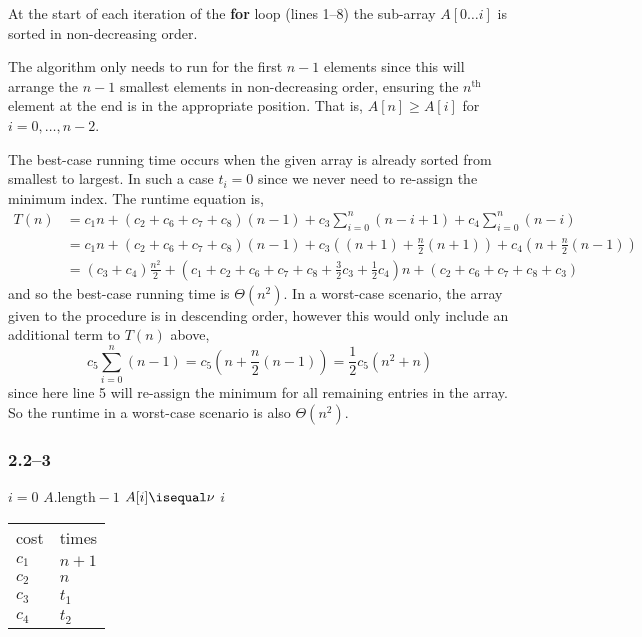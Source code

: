 \begin{invariant}
	At the start of each iteration of the \textbf{for} loop (lines 1--8) the sub-array $A[0\ldots i]$ is sorted in non-decreasing order.
\end{invariant}

The algorithm only needs to run for the first $n-1$ elements since this will arrange the $n-1$ smallest elements in non-decreasing order, ensuring the $n^{\text{th}}$ element at the end is in the appropriate position. That is, $A[n]\geq A[i]$ for $i=0,\ldots,n-2$.

The best-case running time occurs when the given array is already sorted from smallest to largest. In such a case $t_{i}=0$ since we never need to re-assign the minimum index. The runtime equation is, 
\begin{equation*}
	\begin{aligned}
		T(n) &= c_{1}n + (c_{2}+c_{6}+c_{7}+c_{8})(n-1) + c_{3}\sum_{i=0}^{n}(n-i+1) + c_{4}\sum_{i=0}^{n}(n-i)\\
		&= c_{1}n + (c_{2}+c_{6}+c_{7}+c_{8})(n-1) + c_{3}\left((n+1) + \frac{n}{2}(n+1)\right) + c_{4}\left(n + \frac{n}{2}(n-1)\right)\\
		&= (c_{3}+c_{4})\frac{n^{2}}{2} + (c_{1} + c_{2} + c_{6} + c_{7} + c_{8} + \frac{3}{2}c_{3} + \frac{1}{2}c_{4})n + (c_{2}+c_{6}+c_{7}+c_{8} + c_{3})
	\end{aligned}
\end{equation*}
and so the best-case running time is $\Theta(n^{2})$. In a worst-case scenario, the array given to the procedure is in descending order, however this would only include an additional term to $T(n)$ above,
\begin{equation*}
	c_{5}\sum_{i=0}^{n}(n-1) = c_{5}\left(n + \frac{n}{2}(n-1)\right) = \frac{1}{2}c_{5}(n^{2}+n)
\end{equation*}
since here line 5 will re-assign the minimum for all remaining entries in the array. So the runtime in a worst-case scenario is also $\Theta(n^{2})$.

\subsubsection*{2.2--3}

\begin{multicols}{2}
	\begin{codebox}
		\li \For $i = 0$ \To $A.\text{length}-1$
		\li	\Do
					\If $A[i] \isequal \nu$
		\li		\Then
						\Return $i$
					\End
				\End
		\li \Return {}
	\end{codebox}
	\columnbreak
	\begin{tabular}{ l l }
		cost & times\\
		$c_{1}$ & $n+1$\\
		$c_{2}$ & $n$\\
		$c_{3}$ & $t_{1}$\\
		$c_{4}$ & $t_{2}$
	\end{tabular}
\end{multicols}

